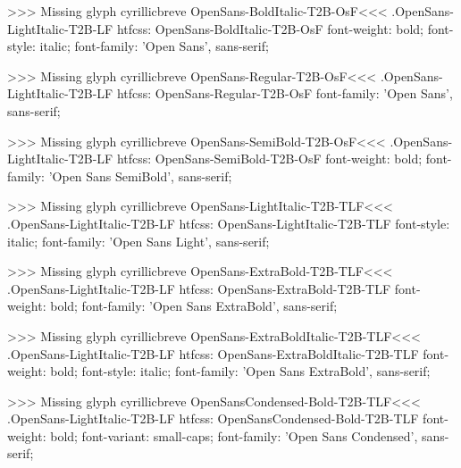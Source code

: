 >>>
Missing glyph	cyrillicbreve
\<OpenSans-BoldItalic-T2B-OsF\><<<
.OpenSans-LightItalic-T2B-LF
htfcss:  OpenSans-BoldItalic-T2B-OsF  font-weight: bold; font-style: italic; font-family: 'Open Sans', sans-serif;

>>>
Missing glyph	cyrillicbreve
\<OpenSans-Regular-T2B-OsF\><<<
.OpenSans-LightItalic-T2B-LF
htfcss:  OpenSans-Regular-T2B-OsF  font-family: 'Open Sans', sans-serif;

>>>
Missing glyph	cyrillicbreve
\<OpenSans-SemiBold-T2B-OsF\><<<
.OpenSans-LightItalic-T2B-LF
htfcss:  OpenSans-SemiBold-T2B-OsF  font-weight: bold; font-family: 'Open Sans SemiBold', sans-serif;

>>>
Missing glyph	cyrillicbreve
\<OpenSans-LightItalic-T2B-TLF\><<<
.OpenSans-LightItalic-T2B-LF
htfcss:  OpenSans-LightItalic-T2B-TLF  font-style: italic; font-family: 'Open Sans Light', sans-serif;

>>>
Missing glyph	cyrillicbreve
\<OpenSans-ExtraBold-T2B-TLF\><<<
.OpenSans-LightItalic-T2B-LF
htfcss:  OpenSans-ExtraBold-T2B-TLF  font-weight: bold; font-family: 'Open Sans ExtraBold', sans-serif;

>>>
Missing glyph	cyrillicbreve
\<OpenSans-ExtraBoldItalic-T2B-TLF\><<<
.OpenSans-LightItalic-T2B-LF
htfcss:  OpenSans-ExtraBoldItalic-T2B-TLF  font-weight: bold; font-style: italic; font-family: 'Open Sans ExtraBold', sans-serif;

>>>
Missing glyph	cyrillicbreve
\<OpenSansCondensed-Bold-T2B-TLF\><<<
.OpenSans-LightItalic-T2B-LF
htfcss:  OpenSansCondensed-Bold-T2B-TLF  font-weight: bold; font-variant: small-caps; font-family: 'Open Sans Condensed', sans-serif;

